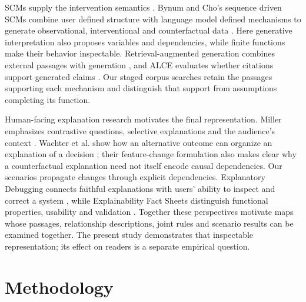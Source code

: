 \documentclass{svproc}
\begin{document}
SCMs supply the intervention semantics \cite{pearl2009}. Bynum and Cho's sequence driven SCMs combine user defined structure with language model defined mechanisms to generate observational, interventional and counterfactual data \cite{bynum2025}. Here generative interpretation also proposes variables and dependencies, while finite functions make their behavior inspectable. Retrieval-augmented generation combines external passages with generation \cite{lewis2020}, and ALCE evaluates whether citations support generated claims \cite{gao_citations2023}. Our staged corpus searches retain the passages supporting each mechanism and distinguish that support from assumptions completing its function.

Human-facing explanation research motivates the final representation. Miller emphasizes contrastive questions, selective explanations and the audience's context \cite{miller2019}. Wachter et al. show how an alternative outcome can organize an explanation of a decision \cite{wachter2018}; their feature-change formulation also makes clear why a counterfactual explanation need not itself encode causal dependencies. Our scenarios propagate changes through explicit dependencies. Explanatory Debugging connects faithful explanations with users' ability to inspect and correct a system \cite{kulesza2015}, while Explainability Fact Sheets distinguish functional properties, usability and validation \cite{sokol2020}. Together these perspectives motivate maps whose passages, relationship descriptions, joint rules and scenario results can be examined together. The present study demonstrates that inspectable representation; its effect on readers is a separate empirical question.



\section{Methodology}\label{sec:method}
\end{document}
